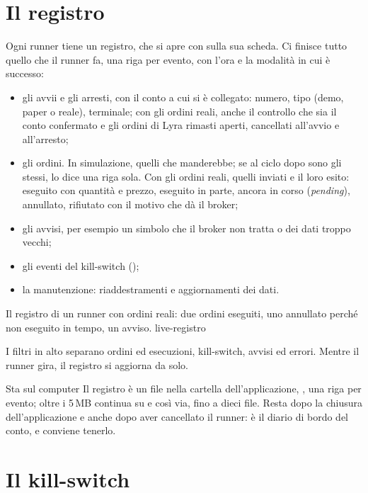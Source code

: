 \section{Il registro}\label{sez:registro}

Ogni runner tiene un registro, che si apre con  sulla sua
scheda. Ci finisce tutto quello che il runner fa, una riga per evento, con
l'ora e la modalità in cui è successo:

\begin{itemize}
  \item gli avvii e gli arresti, con il conto a cui si è collegato: numero,
        tipo (demo, paper o reale), terminale; con gli ordini reali, anche
        il controllo che sia il conto confermato e gli ordini di Lyra
        rimasti aperti, cancellati all'avvio e all'arresto;
  \item gli ordini. In simulazione, quelli che manderebbe; se al ciclo
        dopo sono gli stessi, lo dice una riga sola. Con gli ordini reali,
        quelli inviati e il loro esito: eseguito con quantità e prezzo,
        eseguito in parte, ancora in corso (\emph{pending}), annullato,
        rifiutato con il motivo che dà il broker;
  \item gli avvisi, per esempio un simbolo che il broker non tratta o dei
        dati troppo vecchi;
  \item gli eventi del kill-switch ();
  \item la manutenzione: riaddestramenti e aggiornamenti dei dati.
\end{itemize}

  {Il registro di un runner con ordini reali: due ordini eseguiti, uno
   annullato perché non eseguito in tempo, un avviso.}
  {live-registro}

\noindent
I filtri in alto separano ordini ed esecuzioni, kill-switch, avvisi ed
errori. Mentre il runner gira, il registro si aggiorna da solo.

\begin{nota}{Sta sul computer}
Il registro è un file nella cartella dell'applicazione,
, una riga per evento; oltre i
\num{5}\,MB continua su  e così via, fino a dieci file.
Resta dopo la chiusura dell'applicazione e anche dopo aver cancellato il
runner: è il diario di bordo del conto, e conviene tenerlo.
\end{nota}

\section{Il kill-switch}\label{sez:kill-switch}

